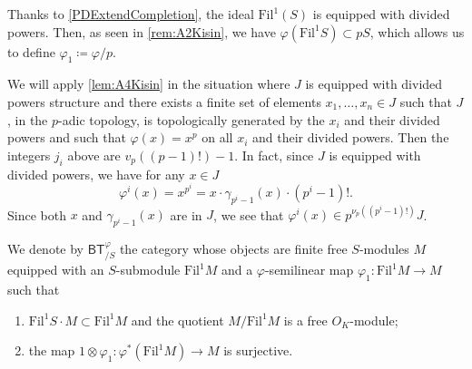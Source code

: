 \begin{ntt}[]\label{not:phi1S}
	Thanks to \cref{PDExtendCompletion}, the ideal 
	$\mathrm{Fil}^1(S)$ is equipped with divided powers.
	Then, as seen in \cref{rem:A2Kisin}, 
	we have $\varphi( \mathrm{Fil}^1 S) \subset p S$, which
	allows us to define $\varphi_1 \coloneqq \varphi/p$.
\end{ntt}


\begin{rem}[]\label{rem:j_iTheoremA6}
	We will apply \cref{lem:A4Kisin} in the situation where $J$ is equipped
	with divided powers structure and there exists a finite set of 
	elements $x_1, \ldots, x_n \in J$ such that $J$, in the $p$-adic topology, 
	is topologically generated by the $x_i$ and their divided powers
	and such that $\varphi(x) = x^p$ on all $x_i$ and their divided powers.
	Then the integers $j_i$ above are $v_p \left( (p-1)! \right) - 1$.
	In fact, since $J$ is equipped with divided powers, we have for any $x \in J$
	\begin{equation*}
		\varphi^i(x) =
		x^{p^i} =
		x \cdot \gamma_{p^i-1}(x) \cdot (p^i-1)!
	.\end{equation*}
	Since both $x$ and $\gamma_{p^i-1}(x)$ are in $J$,
	we see that $\varphi^i(x) \in p^{\nu_p((p^i-1)!)}J$.
\end{rem}


\begin{defn}[]
	We denote by $\mathsf{BT}^{\varphi}_{/S}$ the category
	whose objects are finite free $S$-modules $M$
	equipped with an $S$-submodule $\mathrm{Fil}^1 M$
	and a $\varphi$-semilinear map $\varphi_1\colon  \mathrm{Fil}^1 M \to M$
	such that
\begin{enumerate}
	\item $\mathrm{Fil}^1 S \cdot M \subset \mathrm{Fil}^1 M$
		and the quotient $M/\mathrm{Fil}^1 M$ is a free $O_{ K }$-module;
	\item the map $1 \otimes \varphi_1\colon 
		\varphi^* \left( \mathrm{Fil}^1 M \right) \to M$
		is surjective.
\end{enumerate}
\end{defn}


